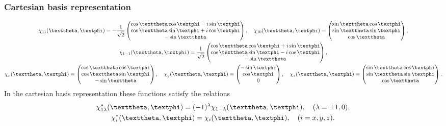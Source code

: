 \subsubsection{Cartesian basis representation}
\begin{gather}
\chi_{11}(\vartheta, \varphi)=-\frac{1}{\sqrt{2}}\begin{pmatrix}
\cos \vartheta \cos \varphi-i \sin \varphi \\
\cos \vartheta \sin \varphi+i \cos \varphi \\
-\sin \vartheta
\end{pmatrix}, \quad \chi_{10}(\vartheta, \varphi)=\begin{pmatrix}
\sin \vartheta \cos \varphi \\
\sin \vartheta \sin \varphi \\
\cos \vartheta
\end{pmatrix}, \notag\\
\chi_{1-1}(\vartheta, \varphi)=\frac{1}{\sqrt{2}}\begin{pmatrix}
\cos \vartheta \cos \varphi+i \sin \varphi \\
\cos \vartheta \sin \varphi-i \cos \varphi \\
-\sin \vartheta
\end{pmatrix}, \label{eq:6:3:51}\\
\chi_{x}(\vartheta, \varphi)=\begin{pmatrix}
\cos \vartheta \cos \varphi \\
\cos \vartheta \sin \varphi \\
-\sin \vartheta
\end{pmatrix}, \quad \chi_{y}(\vartheta, \varphi)=\begin{pmatrix}
-\sin \varphi \\
\cos \varphi \\
0
\end{pmatrix}, \quad \chi_{z}(\vartheta, \varphi)=\begin{pmatrix}
\sin \vartheta \cos \varphi \\
\sin \vartheta \sin \varphi \\
\cos \vartheta
\end{pmatrix} . \label{eq:6:3:52}
\end{gather}
In the cartesian basis representation these functions satisfy the relations
\begin{gather}
\chi_{1 \lambda}^{*}(\vartheta, \varphi)=(-1)^{\lambda} \chi_{1-\lambda}(\vartheta, \varphi), \quad(\lambda= \pm 1,0)  , \label{eq:6:3:53}\\
\chi_{i}^{*}(\vartheta, \varphi)=\chi_{i}(\vartheta, \varphi), \quad(i=x, y, z) . \notag
\end{gather}
